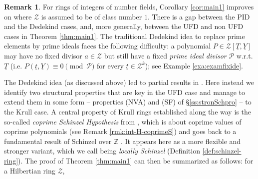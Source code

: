\documentclass[11pt,a4paper,reqno]{amsart}
\def\Z{\mathbb{Z}}
\theoremstyle{definition}
\newtheorem{rmk}[thm]{Remark}
\begin{document}
{\begin{rmk} 
\label{rmk:number-fields} %
For rings of integers of number fields, Corollary \ref{cor:main1} improves on \cite[Theorem 1.1]{BDKN22} where ${\mathcal Z}$ is assumed to be of class number $1$. 
There is a gap between the PID and the Dedekind cases, and, more generally, between the UFD and non UFD cases in Theorem \ref{thm:main1}. The traditional Dedekind idea to replace prime elements by prime ideals faces the following difficulty:
a polynomial $P \in \mathcal{Z}[\underline{T},\underline{Y}]$ 
may have no fixed divisor $a\in {\mathcal Z}$ but still have a fixed \emph{prime 
ideal divisor} ${\mathcal P}$ \hbox{w.r.t.} $\underline T$ (\hbox{i.e.} 
$P(\underline{t},\underline{Y}) \equiv 0 \pmod{{\mathcal P}}$ 
for every $\underline{t} \in {\mathcal Z}^k$); see Example \ref{exa:examfixide}.
\end{rmk}

The Dedekind idea (as discussed above) led to partial results in \cite{BDKN22}. Here instead we identify two structural properties that are
key in the UFD case and manage to extend them in some form -- properties (NVA) and (SF) of \S \ref{ss:stronSchpro} -- to the Krull case.
A central property of Krull rings established along the way is the so-called  \emph{coprime Schinzel Hypothesis} from \cite{BDKN22}, which is about coprime values of coprime polynomials (see Remark \ref{rmk:int-H-coprimeS}) and goes back to a fundamental result of Schinzel over $\Z$ \cite{schinzel2002}. It appears here as a more flexible and stronger variant, which we call being \emph{locally Schinzel} (Definition \ref{def:schinzel-ring}). The proof of Theorem \ref{thm:main1} can then be summarized as follows: for a Hilbertian ring ${\mathcal Z}$,
\vskip 1mm

}
\end{document}
